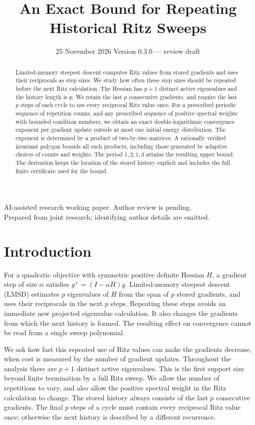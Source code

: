 \documentclass[11pt,a4paper]{article}
\title{An Exact Bound for Repeating\\ Historical Ritz Sweeps}
\author{}
\date{25 November 2026 \quad\textbullet\quad Version 0.3.0 --- review draft}
\numberwithin{equation}{section}
\begin{document}
\maketitle
\begin{center}
\small AI-assisted research working paper. Author review is pending.\\
Prepared from joint research; identifying author details are omitted.
\end{center}
\begin{abstract}
Limited-memory steepest descent computes Ritz values from stored gradients and uses their reciprocals as step sizes. We study how often these step sizes should be repeated before the next Ritz calculation. The Hessian has \(p+1\) distinct active eigenvalues and the history length is \(p\). We retain the last \(p\) consecutive gradients, and require the last \(p\) steps of each cycle to use every reciprocal Ritz value once. For a prescribed periodic sequence of repetition counts, and any prescribed sequence of positive spectral weights with bounded condition numbers, we obtain an exact double-logarithmic convergence exponent per gradient update outside at most one initial energy distribution. The exponent is determined by a product of two-by-two matrices. A rationally verified invariant polygon bounds all such products, including those generated by adaptive choices of counts and weights. The period \(1,2,1,3\) attains the resulting upper bound. The derivation keeps the location of the stored history explicit and includes the full finite certificate used for the bound.
\end{abstract}

\section{Introduction}\label{sec:intro}
For a quadratic objective with symmetric positive definite Hessian
\(H\), a gradient step of size \(\alpha\) satisfies
\(g^+=(I-\alpha H)g\). Limited-memory steepest descent (LMSD)
estimates \(p\) eigenvalues of \(H\) from the span of \(p\) stored
gradients, and uses their reciprocals in the next \(p\) steps.
Repeating these steps avoids an immediate new projected eigenvalue
calculation. It also changes the gradients from which the next
history is formed. The resulting effect on convergence cannot be
read from a single sweep polynomial.

We ask how fast this repeated use of Ritz values can make the
gradients decrease, when cost is measured by the number of gradient
updates. Throughout the analysis there are \(p+1\) distinct active
eigenvalues. This is the first support size beyond finite
termination by a full Ritz sweep. We allow the number of repetitions
to vary, and also allow the positive spectral weight in the Ritz
calculation to change. The stored history always consists of the
last \(p\) consecutive gradients. The final \(p\) steps of a cycle
must contain every reciprocal Ritz value once; otherwise the next
history is described by a different recurrence.
\end{document}
